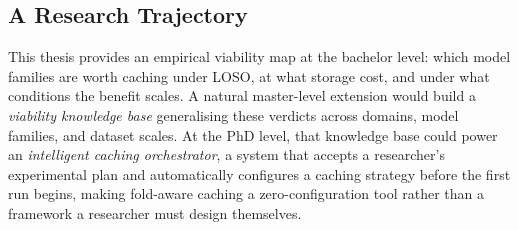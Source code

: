 \subsection*{A Research Trajectory}

This thesis provides an empirical viability map at the bachelor level: which
model families are worth caching under LOSO, at what storage cost, and under
what conditions the benefit scales. A natural master-level extension would
build a \textit{viability knowledge base} generalising these verdicts across
domains, model families, and dataset scales. At the PhD level, that knowledge
base could power an \textit{intelligent caching orchestrator}, a system
that accepts a researcher's experimental plan and automatically configures a
caching strategy before the first run begins, making fold-aware caching a
zero-configuration tool rather than a framework a researcher must design
themselves.
